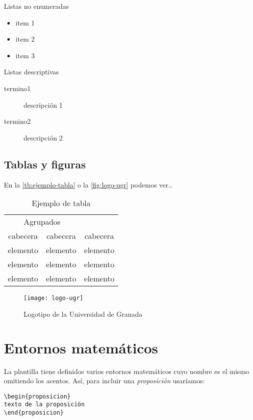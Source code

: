 Listas no enumeradas
\begin{itemize}
  \item item 1
  \item item 2
  \item item 3
  \end{itemize}

Listas descriptivas
\begin{description}
  \item[termino1] descripción 1
  \item[termino2] descripción 2
\end{description}
  
\subsection{Tablas y figuras}

En la \autoref{tb:ejemplo-tabla} o la \autoref{fig:logo-ugr} podemos ver\ldots

\begin{table}[htpb]
  \centering
  \begin{tabular}{ccc} \toprule
    \multicolumn{2}{c}{Agrupados} \\ \cmidrule(r){1-2}
    cabecera & cabecera & cabecera          \\ \midrule
    elemento & elemento & elemento          \\ 
    elemento & elemento & elemento          \\ 
    elemento & elemento & elemento          \\ \bottomrule
  \end{tabular}
  \caption{Ejemplo de tabla}
  \label{tb:ejemplo-tabla}
\end{table}

\begin{figure}[htpb]
  \centering
  \texttt{[image: logo-ugr]}
  \caption{Logotipo de la Universidad de Granada}
  \label{fig:logo-ugr}
\end{figure}

\section{Entornos matemáticos}\label{sec:entornos-matematicos}

La plantilla tiene definidos varios entornos matemáticos cuyo nombre es el mismo omitiendo los acentos. Así, para incluir una \emph{proposición} usaríamos:

\begin{verbatim}
\begin{proposicion}
texto de la proposición
\end{proposicion} 
\end{verbatim}


